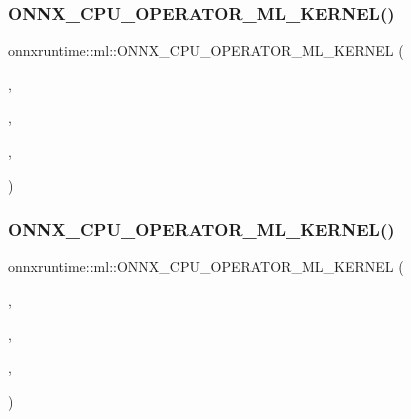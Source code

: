 \subsubsection{\texorpdfstring{O\+N\+N\+X\+\_\+\+C\+P\+U\+\_\+\+O\+P\+E\+R\+A\+T\+O\+R\+\_\+\+M\+L\+\_\+\+K\+E\+R\+N\+E\+L()}{ONNX\_CPU\_OPERATOR\_ML\_KERNEL()}\hspace{0.1cm}{\footnotesize\ttfamily [7/11]}}
{\footnotesize\ttfamily onnxruntime\+::ml\+::\+O\+N\+N\+X\+\_\+\+C\+P\+U\+\_\+\+O\+P\+E\+R\+A\+T\+O\+R\+\_\+\+M\+L\+\_\+\+K\+E\+R\+N\+EL (\begin{DoxyParamCaption}\item[{Binarizer}]{,  }\item[{1}]{,  }\item[{\mbox{\hyperlink{classonnxruntime_1_1KernelDefBuilder}{Kernel\+Def\+Builder}}().Type\+Constraint(\char`\"{}T\char`\"{}, Data\+Type\+Impl\+::\+Get\+Tensor\+Type$<$ float $>$())}]{,  }\item[{\mbox{\hyperlink{classonnxruntime_1_1ml_1_1BinarizerOp}{Binarizer\+Op}}$<$ float $>$}]{ }\end{DoxyParamCaption})}

\mbox{\label{namespaceonnxruntime_1_1ml_ae3b5569105327291c8f8700462d69231}} 
\subsubsection{\texorpdfstring{O\+N\+N\+X\+\_\+\+C\+P\+U\+\_\+\+O\+P\+E\+R\+A\+T\+O\+R\+\_\+\+M\+L\+\_\+\+K\+E\+R\+N\+E\+L()}{ONNX\_CPU\_OPERATOR\_ML\_KERNEL()}\hspace{0.1cm}{\footnotesize\ttfamily [8/11]}}
{\footnotesize\ttfamily onnxruntime\+::ml\+::\+O\+N\+N\+X\+\_\+\+C\+P\+U\+\_\+\+O\+P\+E\+R\+A\+T\+O\+R\+\_\+\+M\+L\+\_\+\+K\+E\+R\+N\+EL (\begin{DoxyParamCaption}\item[{Zip\+Map}]{,  }\item[{1}]{,  }\item[{\mbox{\hyperlink{classonnxruntime_1_1KernelDefBuilder}{Kernel\+Def\+Builder}}().Type\+Constraint(\char`\"{}T\char`\"{}, \{Data\+Type\+Impl\+::\+Get\+Type$<$ std\+::vector$<$ std\+::map$<$ std\+::string, float $>$$>$$>$(), \mbox{\hyperlink{classonnxruntime_1_1DataTypeImpl_a4a10af95a06b1d04aba64fd7e8c2a8d6}{Data\+Type\+Impl\+::\+Get\+Type}}$<$ std\+::vector$<$ std\+::map$<$ std\+::int64\+\_\+t, float $>$$>$$>$()\})}]{,  }\item[{\mbox{\hyperlink{classonnxruntime_1_1ml_1_1ZipMapOp}{Zip\+Map\+Op}}}]{ }\end{DoxyParamCaption})}

